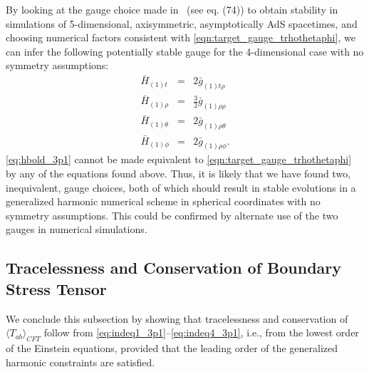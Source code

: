 \documentclass[a4paper,11pt]{article}
\numberwithin{equation}{section}
\begin{document}
By looking at the gauge choice made in~\cite{Bantilan:2012vu} (see eq. (74)) to obtain stability in simulations of 5-dimensional, axisymmetric, asymptotically AdS spacetimes, and choosing numerical factors consistent with \eqref{eqn:target_gauge_trhothetaphi}, we can infer the following potentially stable gauge for the 4-dimensional case with no symmetry assumptions:%
\begin{eqnarray}
\label{eq:hbold_3p1}
\bar{H}_{(1)t}&=&2 \bar{g}_{(1)\text{$t$$\rho $}} \nonumber\\
\bar{H}_{(1)\rho}&=&\frac{3}{2} \bar{g}_{(1) \rho \rho }\nonumber\\
\bar{H}_{(1)\theta}&=&2 \bar{g}_{(1) \rho \theta }\nonumber\\
\bar{H}_{(1)\phi}&=&2 \bar{g}_{(1) \rho \phi }.
\end{eqnarray}
\eqref{eq:hbold_3p1} cannot be made equivalent to \eqref{eqn:target_gauge_trhothetaphi} by any of the equations found above. Thus, it is likely that we have found two, inequivalent, gauge choices, both of which should result in  stable evolutions in a generalized harmonic numerical scheme in spherical coordinates with no symmetry assumptions. This could be confirmed by alternate use of the two gauges in numerical simulations.

\subsection{Tracelessness and Conservation of Boundary Stress Tensor}

We conclude this subsection by showing that tracelessness and conservation of $\langle T_{ab}\rangle_{CFT}$ follow from \eqref{eq:indeq1_3p1}--\eqref{eq:indeq4_3p1}, i.e., from the lowest order of the Einstein equations, provided that the leading order of the generalized harmonic constraints are satisfied. 
\end{document}
